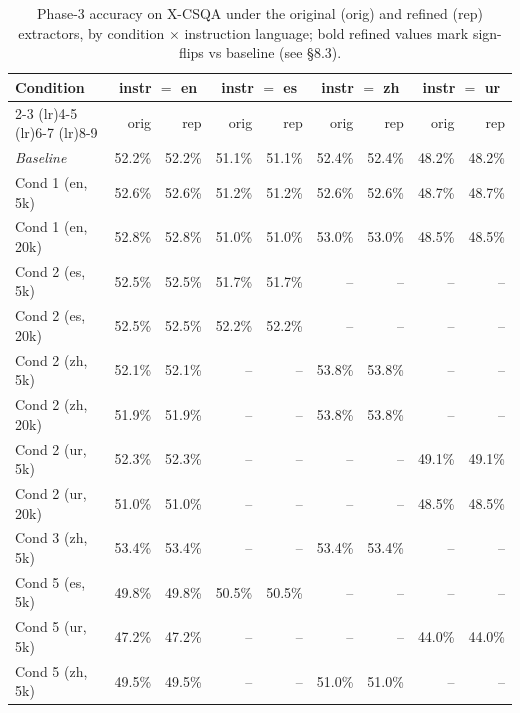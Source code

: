 \begin{table}[t]
  \centering
  \small
  \begin{tabular}{lrrrrrrrr}
    \toprule
    Condition & \multicolumn{2}{c}{instr $=$ en} & \multicolumn{2}{c}{instr $=$ es} & \multicolumn{2}{c}{instr $=$ zh} & \multicolumn{2}{c}{instr $=$ ur} \\
    \cmidrule(lr){2-3} \cmidrule(lr){4-5} \cmidrule(lr){6-7} \cmidrule(lr){8-9}
     & orig & rep & orig & rep & orig & rep & orig & rep \\
    \midrule
    \textit{Baseline} & 52.2\% & 52.2\% & 51.1\% & 51.1\% & 52.4\% & 52.4\% & 48.2\% & 48.2\% \\
    Cond 1 (en, 5k) & 52.6\% & 52.6\% & 51.2\% & 51.2\% & 52.6\% & 52.6\% & 48.7\% & 48.7\% \\
    Cond 1 (en, 20k) & 52.8\% & 52.8\% & 51.0\% & 51.0\% & 53.0\% & 53.0\% & 48.5\% & 48.5\% \\
    Cond 2 (es, 5k) & 52.5\% & 52.5\% & 51.7\% & 51.7\% & -- & -- & -- & -- \\
    Cond 2 (es, 20k) & 52.5\% & 52.5\% & 52.2\% & 52.2\% & -- & -- & -- & -- \\
    Cond 2 (zh, 5k) & 52.1\% & 52.1\% & -- & -- & 53.8\% & 53.8\% & -- & -- \\
    Cond 2 (zh, 20k) & 51.9\% & 51.9\% & -- & -- & 53.8\% & 53.8\% & -- & -- \\
    Cond 2 (ur, 5k) & 52.3\% & 52.3\% & -- & -- & -- & -- & 49.1\% & 49.1\% \\
    Cond 2 (ur, 20k) & 51.0\% & 51.0\% & -- & -- & -- & -- & 48.5\% & 48.5\% \\
    Cond 3 (zh, 5k) & 53.4\% & 53.4\% & -- & -- & 53.4\% & 53.4\% & -- & -- \\
    Cond 5 (es, 5k) & 49.8\% & 49.8\% & 50.5\% & 50.5\% & -- & -- & -- & -- \\
    Cond 5 (ur, 5k) & 47.2\% & 47.2\% & -- & -- & -- & -- & 44.0\% & 44.0\% \\
    Cond 5 (zh, 5k) & 49.5\% & 49.5\% & -- & -- & 51.0\% & 51.0\% & -- & -- \\
    \bottomrule
  \end{tabular}
  \caption{Phase-3 accuracy on \textsc{X-CSQA} under the original (orig) and refined (rep) extractors, by condition $\times$ instruction language; bold refined values mark sign-flips vs baseline (see \S8.3).}
  \label{tab:t3-xcsqa}
\end{table}

